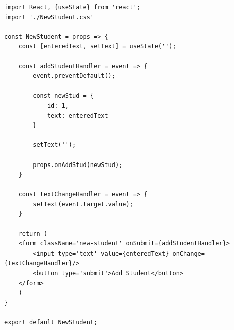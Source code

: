 \begin{lstlisting}
import React, {useState} from 'react';
import './NewStudent.css'

const NewStudent = props => {
    const [enteredText, setText] = useState('');

    const addStudentHandler = event => {
        event.preventDefault();

        const newStud = {
            id: 1,
            text: enteredText
        }

        setText('');

        props.onAddStud(newStud);
    }

    const textChangeHandler = event => {
        setText(event.target.value);
    }

    return (
    <form className='new-student' onSubmit={addStudentHandler}>
        <input type='text' value={enteredText} onChange={textChangeHandler}/>
        <button type='submit'>Add Student</button>
    </form>
    )
}

export default NewStudent;
\end{lstlisting}


\medskip

